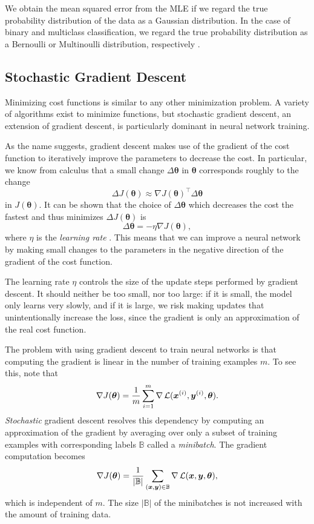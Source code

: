 We obtain the mean squared error from the MLE if we regard the true probability distribution of the data as a Gaussian distribution. In the case of binary and multiclass classification, we regard the true probability distribution as a Bernoulli or Multinoulli distribution, respectively \cite[Ch.\,6,\,pp.\,175-185]{DBLP:books/daglib/0040158}.

\subsection{Stochastic Gradient Descent}
Minimizing cost functions is similar to any other minimization problem. A variety of algorithms exist to minimize functions, but stochastic gradient descent, an extension of gradient descent, is particularly dominant in neural network training.

As the name suggests, gradient descent makes use of the gradient of the cost function to iteratively improve the parameters to decrease the cost. In particular, we know from calculus that a small change $\Delta\bm{\theta}$ in $\bm{\theta}$ corresponds roughly to the change
\begin{equation}
\Delta J(\bm{\theta}) \approx \nabla J(\bm{\theta})^{\top}\Delta\bm{\theta}
\end{equation}
in $J(\bm{\theta})$. It can be shown that the choice of $\Delta\bm{\theta}$ which decreases the cost the fastest and thus minimizes $\Delta J(\bm{\theta})$ is
\begin{equation}
\Delta\bm{\theta} = -\eta\nabla J(\bm{\theta}),
\end{equation}
where $\eta$ is the \emph{learning rate} \cite[Ch.\,4,\,p.\,82]{DBLP:books/daglib/0040158}. This means that we can improve a neural network by making small changes to the parameters in the negative direction of the gradient of the cost function.

The learning rate $\eta$ controls the size of the update steps performed by gradient descent. It should neither be too small, nor too large: if it is small, the model only learns very slowly, and if it is large, we risk making updates that unintentionally increase the loss, since the gradient is only an approximation of the real cost function.

The problem with using gradient descent to train neural networks is that computing the gradient is linear in the number of training examples $m$. To see this, note that
\begin{equation}
\nabla J(\bm{\theta}) = \frac1{m}\sum_{i=1}^{m}\nabla \operatorname{\mathcal{L}}(\bm{x}^{(i)},\bm{y}^{(i)},\bm{\theta}).
\end{equation}
\emph{Stochastic} gradient descent resolves this dependency by computing an approximation of the gradient by averaging over only a subset of training examples with corresponding labels $\mathbb{B}$ called a \emph{minibatch}. The gradient computation becomes
\begin{equation}
\nabla J(\bm{\theta}) = \frac1{|\mathbb{B}|}\sum_{(\bm{x},\bm{y})\in\mathbb{B}}\nabla \operatorname{\mathcal{L}}(\bm{x},\bm{y},\bm{\theta}),
\end{equation}
which is independent of $m$. The size $|\mathbb{B}|$ of the minibatches is not increased with the amount of training data.

